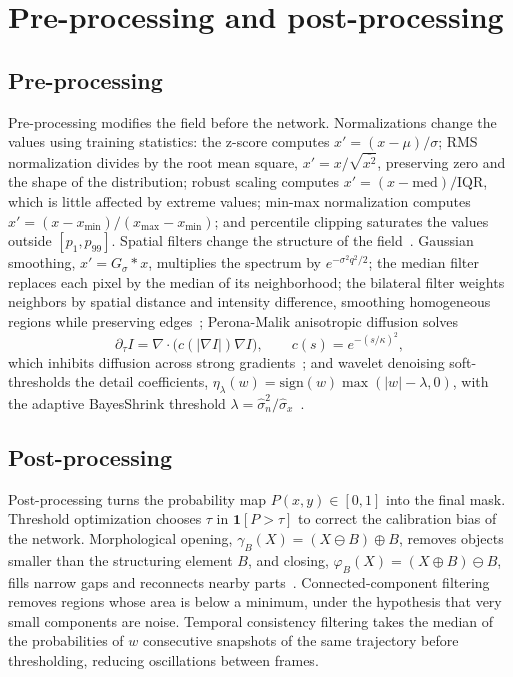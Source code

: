 \documentclass[final,5p,times,twocolumn]{elsarticle}
\newcommand{\ind}{\mathbf{1}}
\begin{document}
\section{Pre-processing and post-processing}\label{sec:sec4}

\subsection{Pre-processing}\label{subsec:pretheory}

Pre-processing modifies the field before the network. Normalizations change the values using training statistics: the z-score computes $x'=(x-\mu)/\sigma$; RMS normalization divides by the root mean square, $x'=x/\sqrt{\overline{x^2}}$, preserving zero and the shape of the distribution; robust scaling computes $x'=(x-\mathrm{med})/\mathrm{IQR}$, which is little affected by extreme values; min-max normalization computes $x'=(x-x_{\min})/(x_{\max}-x_{\min})$; and percentile clipping saturates the values outside $[p_1,p_{99}]$. Spatial filters change the structure of the field~\cite{gonzalez2018}. Gaussian smoothing, $x'=G_\sigma * x$, multiplies the spectrum by $e^{-\sigma^2q^2/2}$; the median filter replaces each pixel by the median of its neighborhood; the bilateral filter weights neighbors by spatial distance and intensity difference, smoothing homogeneous regions while preserving edges~\cite{tomasi1998}; Perona-Malik anisotropic diffusion solves
\begin{equation}\label{eq:pm}
\partial_\tau I=\nabla\cdot\big(c(|\nabla I|)\nabla I\big),\qquad c(s)=e^{-(s/\kappa)^2},
\end{equation}
which inhibits diffusion across strong gradients~\cite{perona1990}; and wavelet denoising soft-thresholds the detail coefficients, $\eta_\lambda(w)=\mathrm{sign}(w)\max(|w|-\lambda,0)$, with the adaptive BayesShrink threshold $\lambda=\hat\sigma_n^2/\hat\sigma_x$~\cite{donoho1994,chang2000,daubechies1992}.

\subsection{Post-processing}\label{subsec:posttheory}

Post-processing turns the probability map $P(x,y)\in[0,1]$ into the final mask. Threshold optimization chooses $\tau$ in $\ind[P>\tau]$ to correct the calibration bias of the network. Morphological opening, $\gamma_B(X)=(X\ominus B)\oplus B$, removes objects smaller than the structuring element $B$, and closing, $\varphi_B(X)=(X\oplus B)\ominus B$, fills narrow gaps and reconnects nearby parts~\cite{serra1982,soille2003}. Connected-component filtering removes regions whose area is below a minimum, under the hypothesis that very small components are noise. Temporal consistency filtering takes the median of the probabilities of $w$ consecutive snapshots of the same trajectory before thresholding, reducing oscillations between frames.
\end{document}
